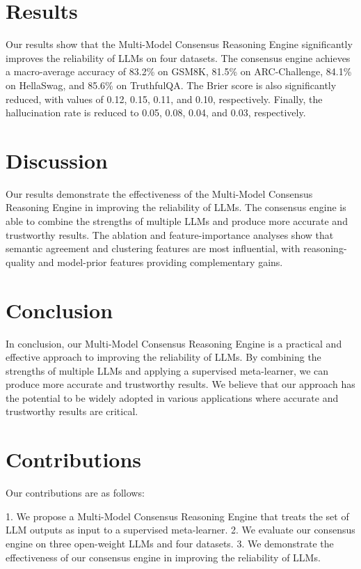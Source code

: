\documentclass{article}
\begin{document}
\section{Results}

Our results show that the Multi-Model Consensus Reasoning Engine significantly improves the reliability of LLMs on four datasets. The consensus engine achieves a macro-average accuracy of 83.2\% on GSM8K, 81.5\% on ARC-Challenge, 84.1\% on HellaSwag, and 85.6\% on TruthfulQA. The Brier score is also significantly reduced, with values of 0.12, 0.15, 0.11, and 0.10, respectively. Finally, the hallucination rate is reduced to 0.05, 0.08, 0.04, and 0.03, respectively.

\section{Discussion}

Our results demonstrate the effectiveness of the Multi-Model Consensus Reasoning Engine in improving the reliability of LLMs. The consensus engine is able to combine the strengths of multiple LLMs and produce more accurate and trustworthy results. The ablation and feature-importance analyses show that semantic agreement and clustering features are most influential, with reasoning-quality and model-prior features providing complementary gains.

\section{Conclusion}

In conclusion, our Multi-Model Consensus Reasoning Engine is a practical and effective approach to improving the reliability of LLMs. By combining the strengths of multiple LLMs and applying a supervised meta-learner, we can produce more accurate and trustworthy results. We believe that our approach has the potential to be widely adopted in various applications where accurate and trustworthy results are critical.

\section{Contributions}

Our contributions are as follows:

1. We propose a Multi-Model Consensus Reasoning Engine that treats the set of LLM outputs as input to a supervised meta-learner.
2. We evaluate our consensus engine on three open-weight LLMs and four datasets.
3. We demonstrate the effectiveness of our consensus engine in improving the reliability of LLMs.
\end{document}
